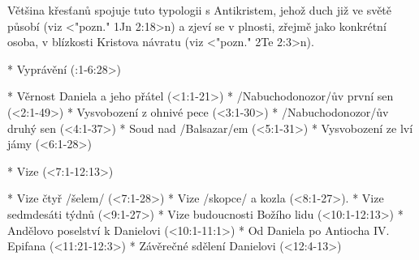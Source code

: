 Většina křesťanů spojuje tuto typologii s Antikristem, jehož duch již ve světě působí (viz <"pozn." 1Jn 2:18>n) a zjeví se v plnosti, zřejmě jako konkrétní osoba, v blízkosti Kristova návratu (viz <"pozn." 2Te 2:3>n).



\Outline

\begitems
{}
* Vyprávění (:1-6:28>)

  \begitems
  * Věrnost Daniela a jeho přátel (<1:1-21>)
  * \x/Nabuchodonozor/ův první sen (<2:1-49>)
  * Vysvobození z ohnivé pece (<3:1-30>)
  * \x/Nabuchodonozor/ův druhý sen (<4:1-37>)
  * Soud nad \x/Balsazar/em (<5:1-31>)
  * Vysvobození ze lví jámy (<6:1-28>)
  \enditems

* Vize (<7:1-12:13>)

  \begitems
  * Vize  čtyř \x/šelem/ (<7:1-28>)
  * Vize \x/skopce/ a kozla (<8:1-27>).
  * Vize sedmdesáti týdnů (<9:1-27>)
  * Vize budoucnosti Božího lidu \nl (<10:1-12:13>)
    \begitems
    * Andělovo poselství k Danielovi \nl (<10:1-11:1>)
    * Od Daniela  po Antiocha IV. Epifana \nl (<11:21-12:3>)
    * Závěrečné sdělení Danielovi \nl (<12:4-13>)
    \enditems
  \enditems

\enditems
